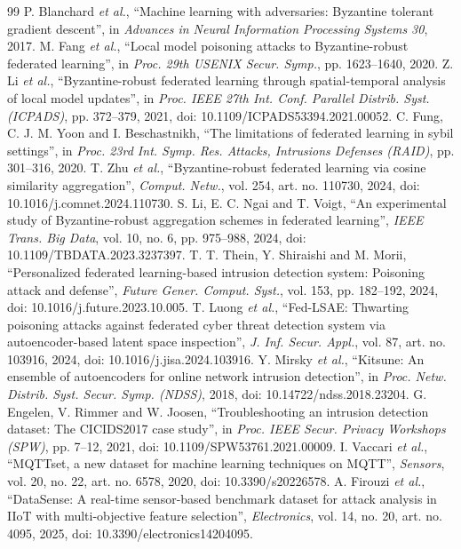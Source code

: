 \documentclass[12pt,a4paper]{report}
\begin{document}
\begin{thebibliography}{99}
 P. Blanchard \textit{et al.}, ``Machine learning with adversaries: Byzantine tolerant gradient descent'', in \textit{Advances in Neural Information Processing Systems 30}, 2017.
 M. Fang \textit{et al.}, ``Local model poisoning attacks to Byzantine-robust federated learning'', in \textit{Proc. 29th USENIX Secur. Symp.}, pp. 1623--1640, 2020.
 Z. Li \textit{et al.}, ``Byzantine-robust federated learning through spatial-temporal analysis of local model updates'', in \textit{Proc. IEEE 27th Int. Conf. Parallel Distrib. Syst. (ICPADS)}, pp. 372--379, 2021, doi: 10.1109/ICPADS53394.2021.00052.
 C. Fung, C. J. M. Yoon and I. Beschastnikh, ``The limitations of federated learning in sybil settings'', in \textit{Proc. 23rd Int. Symp. Res. Attacks, Intrusions Defenses (RAID)}, pp. 301--316, 2020.
 T. Zhu \textit{et al.}, ``Byzantine-robust federated learning via cosine similarity aggregation'', \textit{Comput. Netw.}, vol. 254, art. no. 110730, 2024, doi: 10.1016/j.comnet.2024.110730.
 S. Li, E. C. Ngai and T. Voigt, ``An experimental study of Byzantine-robust aggregation schemes in federated learning'', \textit{IEEE Trans. Big Data}, vol. 10, no. 6, pp. 975--988, 2024, doi: 10.1109/TBDATA.2023.3237397.
 T. T. Thein, Y. Shiraishi and M. Morii, ``Personalized federated learning-based intrusion detection system: Poisoning attack and defense'', \textit{Future Gener. Comput. Syst.}, vol. 153, pp. 182--192, 2024, doi: 10.1016/j.future.2023.10.005.
 T. Luong \textit{et al.}, ``Fed-LSAE: Thwarting poisoning attacks against federated cyber threat detection system via autoencoder-based latent space inspection'', \textit{J. Inf. Secur. Appl.}, vol. 87, art. no. 103916, 2024, doi: 10.1016/j.jisa.2024.103916.
 Y. Mirsky \textit{et al.}, ``Kitsune: An ensemble of autoencoders for online network intrusion detection'', in \textit{Proc. Netw. Distrib. Syst. Secur. Symp. (NDSS)}, 2018, doi: 10.14722/ndss.2018.23204.
 G. Engelen, V. Rimmer and W. Joosen, ``Troubleshooting an intrusion detection dataset: The CICIDS2017 case study'', in \textit{Proc. IEEE Secur. Privacy Workshops (SPW)}, pp. 7--12, 2021, doi: 10.1109/SPW53761.2021.00009.
 I. Vaccari \textit{et al.}, ``MQTTset, a new dataset for machine learning techniques on MQTT'', \textit{Sensors}, vol. 20, no. 22, art. no. 6578, 2020, doi: 10.3390/s20226578.
 A. Firouzi \textit{et al.}, ``DataSense: A real-time sensor-based benchmark dataset for attack analysis in IIoT with multi-objective feature selection'', \textit{Electronics}, vol. 14, no. 20, art. no. 4095, 2025, doi: 10.3390/electronics14204095.

\end{thebibliography}
\end{document}
